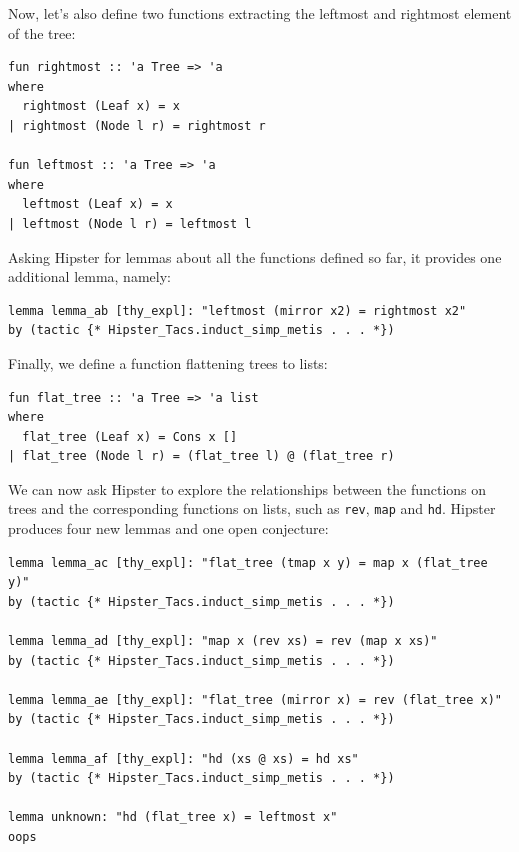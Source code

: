 Now, let's also define two functions extracting the leftmost and rightmost element of the tree:
\begin{small}
\begin{verbatim}
fun rightmost :: 'a Tree => 'a
where 
  rightmost (Leaf x) = x
| rightmost (Node l r) = rightmost r

fun leftmost :: 'a Tree => 'a
where 
  leftmost (Leaf x) = x
| leftmost (Node l r) = leftmost l
\end{verbatim}
\end{small}
Asking Hipster for lemmas about all the functions defined so far, it provides one additional lemma, namely:
\begin{small}
\begin{verbatim}
lemma lemma_ab [thy_expl]: "leftmost (mirror x2) = rightmost x2"
by (tactic {* Hipster_Tacs.induct_simp_metis . . . *})
\end{verbatim}
\end{small}
Finally, we define a function flattening trees to lists:
\begin{small}
\begin{verbatim}
fun flat_tree :: 'a Tree => 'a list
where
  flat_tree (Leaf x) = Cons x []
| flat_tree (Node l r) = (flat_tree l) @ (flat_tree r)
\end{verbatim}
\end{small}
We can now ask Hipster to explore the relationships between the functions on trees and the corresponding functions on lists, such as \texttt{rev}, \texttt{map} and \texttt{hd}. Hipster produces four new lemmas and one open conjecture:
\begin{small}
\begin{verbatim}
lemma lemma_ac [thy_expl]: "flat_tree (tmap x y) = map x (flat_tree y)"
by (tactic {* Hipster_Tacs.induct_simp_metis . . . *})

lemma lemma_ad [thy_expl]: "map x (rev xs) = rev (map x xs)"
by (tactic {* Hipster_Tacs.induct_simp_metis . . . *})

lemma lemma_ae [thy_expl]: "flat_tree (mirror x) = rev (flat_tree x)"
by (tactic {* Hipster_Tacs.induct_simp_metis . . . *})

lemma lemma_af [thy_expl]: "hd (xs @ xs) = hd xs"
by (tactic {* Hipster_Tacs.induct_simp_metis . . . *})

lemma unknown: "hd (flat_tree x) = leftmost x"
oops
\end{verbatim}
\end{small}
